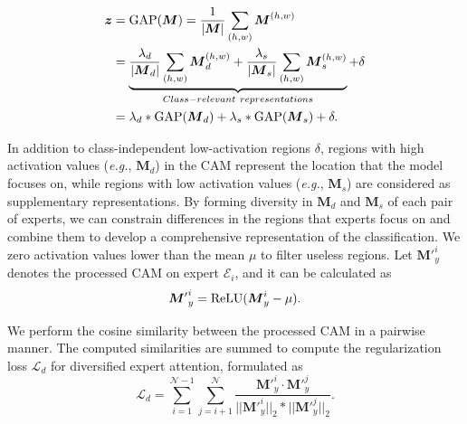 \documentclass[letterpaper]{article} %
\newcommand{\eg}{{\emph{e.g.}}}
\begin{document}
\begin{equation}
\begin{aligned}
\boldsymbol{z}&={\rm GAP}(\boldsymbol{M})=\frac{1}{|\boldsymbol{M}|}\sum_{(h,w)}{\boldsymbol{M}^{(h,w)}}\\&=\underbrace{\frac{\lambda_d}{|\boldsymbol{M}_d|}\sum_{(h,w)}{\boldsymbol{M}^{(h,w)}_d}+\frac{\lambda_s}{|\boldsymbol{M}_s|}\sum_{(h,w)}{\boldsymbol{M}^{(h,w)}_s}}_{Class-relevant\ representations}+\delta\\&=\lambda_d*{\rm GAP}(\boldsymbol{M}_d)+\lambda_s*{\rm GAP}(\boldsymbol{M}_s)+\delta.
\label{eq:gap}
\end{aligned}
\end{equation}

In addition to class-independent low-activation regions $\delta$, regions with high activation values (\eg, $\boldsymbol{M}_d$) in the CAM represent the location that the model focuses on, while regions with low activation values (\eg, $\boldsymbol{M}_s$) are considered as supplementary representations. By forming diversity in $\boldsymbol{M}_d$ and $\boldsymbol{M}_s$ of each pair of experts, we can constrain differences in the regions that experts focus on and combine them to develop a comprehensive representation of the classification. We zero activation values lower than the mean $\mu$ to filter useless regions. Let $\boldsymbol{M}\mathrm{'}_{y}^{i}$ denotes the processed CAM on expert $\mathcal{E}_i$, and it can be calculated as
\begin{equation}
\boldsymbol{M}\mathrm{'}_{y}^{i}={\rm{ReLU}}(\boldsymbol{M}_{y}^{i}-\mu).
\label{eq:cam_relu}
\end{equation}

We perform the cosine similarity between the processed CAM in a pairwise manner. The computed similarities are summed to compute the regularization loss $\mathcal{L}_d$ for diversified expert attention, formulated as
\begin{equation}
\mathcal{L}_d=\sum_{i=1}^{\mathcal{N}-1}\sum_{j=i+1}^{\mathcal{N}}\frac{\boldsymbol{M}\mathrm{'}_{y}^{i}\cdot\boldsymbol{M}\mathrm{'}_{y}^{j}}{\big|\big|\boldsymbol{M}\mathrm{'}_{y}^{i}\big|\big|_2*\big|\big|\boldsymbol{M}\mathrm{'}_{y}^{j}\big|\big|_2}.
\label{eq:diver_loss}
\end{equation}
\end{document}
